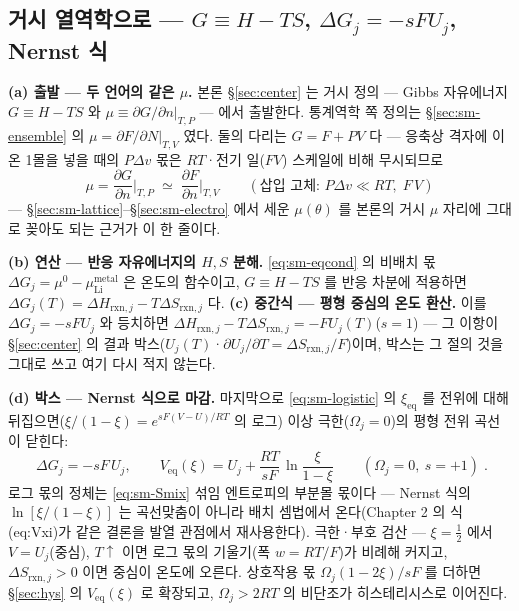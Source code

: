 \documentclass[11pt,a4paper]{article}
\newcommand{\eq}{\mathrm{eq}}
\newcommand{\rxn}{\mathrm{rxn}}
\begin{document}
\subsection{거시 열역학으로 --- $G\equiv H-TS$, $\Delta G_j=-sFU_j$, Nernst 식}\label{sec:sm-macro}
\textbf{(a) 출발 --- 두 언어의 같은 $\mu$.} 본론 \S\ref{sec:center} 는 거시 정의 --- Gibbs 자유에너지
$G\equiv H-TS$ 와 $\mu\equiv\partial G/\partial n|_{T,P}$ --- 에서 출발한다. 통계역학 쪽 정의는
\S\ref{sec:sm-ensemble} 의 $\mu=\partial F/\partial N|_{T,V}$ 였다. 둘의 다리는 $G=F+PV$ 다 --- 응축상
격자에 이온 1몰을 넣을 때의 $P\Delta v$ 몫은 $RT$·전기 일($FV$) 스케일에 비해 무시되므로
\begin{equation}
\mu=\frac{\partial G}{\partial n}\Big|_{T,P}\;\simeq\;\frac{\partial F}{\partial n}\Big|_{T,V}
\qquad(\text{삽입 고체: }P\Delta v\ll RT,\;F\,V)
\label{eq:sm-mubridge}
\end{equation}
--- \S\ref{sec:sm-lattice}--\S\ref{sec:sm-electro} 에서 세운 $\mu(\theta)$ 를 본론의 거시 $\mu$ 자리에
그대로 꽂아도 되는 근거가 이 한 줄이다.

\textbf{(b) 연산 --- 반응 자유에너지의 $H,S$ 분해.} \eqref{eq:sm-eqcond} 의 비배치 몫
$\Delta G_j=\mu^0-\mu_\mathrm{Li}^\mathrm{metal}$ 은 온도의 함수이고, $G\equiv H-TS$ 를 반응 차분에 적용하면
$\Delta G_j(T)=\Delta H_{\rxn,j}-T\Delta S_{\rxn,j}$ 다. \textbf{(c) 중간식 --- 평형 중심의 온도 환산.}
이를 $\Delta G_j=-sFU_j$ 와 등치하면 $\Delta H_{\rxn,j}-T\Delta S_{\rxn,j}=-FU_j(T)$($s{=}1$) --- 그 이항이
\S\ref{sec:center} 의 결과 박스($U_j(T)$·$\partial U_j/\partial T=\Delta S_{\rxn,j}/F$)이며, 박스는 그 절의
것을 그대로 쓰고 여기 다시 적지 않는다.

\textbf{(d) 박스 --- Nernst 식으로 마감.} 마지막으로 \eqref{eq:sm-logistic} 의 $\xi_\eq$ 를 전위에 대해
뒤집으면($\xi/(1-\xi)=e^{sF(V-U)/RT}$ 의 로그) 이상 극한($\Omega_j=0$)의 평형 전위 곡선이 닫힌다:
\begin{equation}
\boxed{\;
\Delta G_j=-sF\,U_j,
\qquad
V_\eq(\xi)=U_j+\frac{RT}{sF}\,\ln\frac{\xi}{1-\xi}
\qquad(\Omega_j=0,\ s=+1)\;.}
\label{eq:sm-nernst}
\end{equation}
로그 몫의 정체는 \eqref{eq:sm-Smix} 섞임 엔트로피의 부분몰 몫이다 --- Nernst 식의 $\ln[\xi/(1-\xi)]$ 는
곡선맞춤이 아니라 배치 셈법에서 온다(Chapter 2 의 식 (eq:Vxi)가 같은 결론을 발열 관점에서 재사용한다).
극한·부호 검산 --- $\xi=\tfrac12$ 에서 $V=U_j$(중심), $T\!\uparrow$ 이면 로그 몫의 기울기(폭 $w=RT/F$)가
비례해 커지고, $\Delta S_{\rxn,j}>0$ 이면 중심이 온도에 오른다. 상호작용 몫 $\Omega_j(1-2\xi)/sF$ 를 더하면
\S\ref{sec:hys} 의 $V_\eq(\xi)$ 로 확장되고, $\Omega_j>2RT$ 의 비단조가 히스테리시스로 이어진다.
\end{document}

